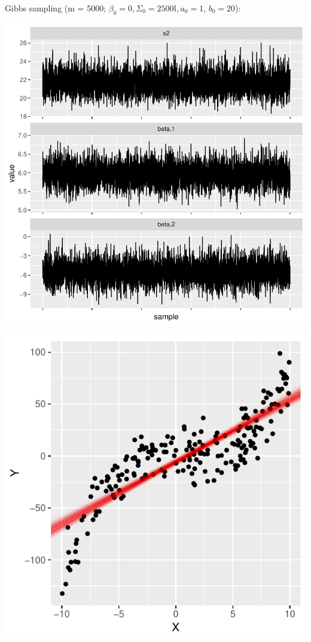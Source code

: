 \begin{frame}
\begin{analysis}

\smallskip

Gibbs sampling (m = 5000; $ \beta_0 =  0, \Sigma_0 = 2500\mathbb{I},a_0 = 1$, $b_0 = 20$):

\bigskip

\begin{minipage}[c]{0.47\linewidth}
\includegraphics[width=0.9\linewidth]{../LectureAssets/L04/SimpleReg04}
\end{minipage} 
\begin{minipage}[c]{0.47\linewidth}
\includegraphics[width=0.9\linewidth]{../LectureAssets/L04/SimpleReg05}
\end{minipage} 


\end{analysis}
\end{frame}
